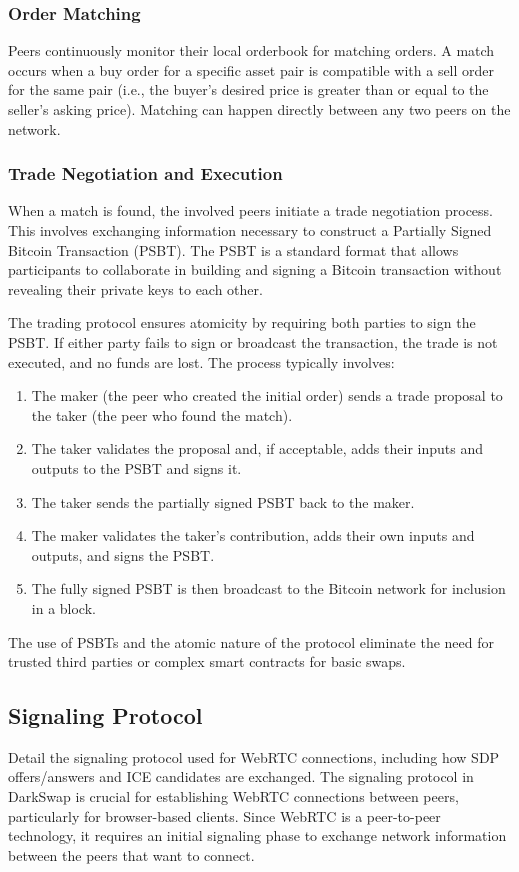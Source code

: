 \documentclass{article}
\begin{document}
\subsubsection{Order Matching}
Peers continuously monitor their local orderbook for matching orders. A match occurs when a buy order for a specific asset pair is compatible with a sell order for the same pair (i.e., the buyer's desired price is greater than or equal to the seller's asking price). Matching can happen directly between any two peers on the network.

\subsubsection{Trade Negotiation and Execution}
When a match is found, the involved peers initiate a trade negotiation process. This involves exchanging information necessary to construct a Partially Signed Bitcoin Transaction (PSBT). The PSBT is a standard format that allows participants to collaborate in building and signing a Bitcoin transaction without revealing their private keys to each other.

The trading protocol ensures atomicity by requiring both parties to sign the PSBT. If either party fails to sign or broadcast the transaction, the trade is not executed, and no funds are lost. The process typically involves:
\begin{enumerate}
    \item The maker (the peer who created the initial order) sends a trade proposal to the taker (the peer who found the match).
    \item The taker validates the proposal and, if acceptable, adds their inputs and outputs to the PSBT and signs it.
    \item The taker sends the partially signed PSBT back to the maker.
    \item The maker validates the taker's contribution, adds their own inputs and outputs, and signs the PSBT.
    \item The fully signed PSBT is then broadcast to the Bitcoin network for inclusion in a block.
\end{enumerate}
The use of PSBTs and the atomic nature of the protocol eliminate the need for trusted third parties or complex smart contracts for basic swaps.

\subsection{Signaling Protocol}
Detail the signaling protocol used for WebRTC connections, including how SDP offers/answers and ICE candidates are exchanged.
The signaling protocol in DarkSwap is crucial for establishing WebRTC connections between peers, particularly for browser-based clients. Since WebRTC is a peer-to-peer technology, it requires an initial signaling phase to exchange network information between the peers that want to connect.
\end{document}
